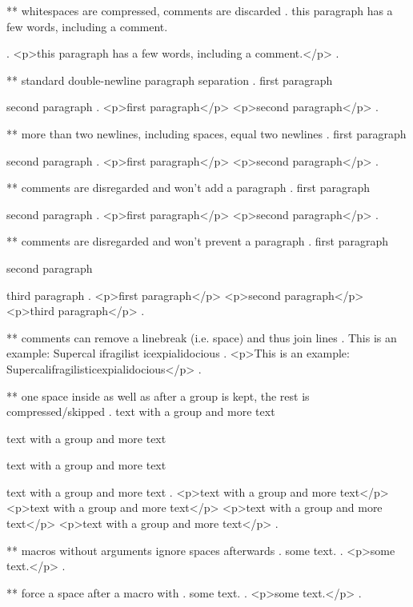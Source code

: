 ** whitespaces are compressed, comments are discarded
.
   this     paragraph  has a    few 
 words,   including
 a comment.


 
.
<p>this paragraph has a few words, including a comment.</p>
.



** standard double-newline paragraph separation
.
first paragraph

 second paragraph
.
<p>ﬁrst paragraph</p>
<p>second paragraph</p>
.



** more than two newlines, including spaces, equal two newlines
.
first paragraph

   
  


second paragraph
.
<p>ﬁrst paragraph</p>
<p>second paragraph</p>
.


** comments are disregarded and won't add a paragraph
.
first paragraph




second paragraph
.
<p>ﬁrst paragraph</p>
<p>second paragraph</p>
.

** comments are disregarded and won't prevent a paragraph
.
first paragraph %

second paragraph%

third paragraph
.
<p>ﬁrst paragraph</p>
<p>second paragraph</p>
<p>third paragraph</p>
.


** comments can remove a linebreak (i.e. space) and thus join lines
.
This is an %
example: Supercal%
              ifragilist%
    icexpialidocious
.
<p>This is an example: Supercalifragilisticexpialidocious</p>
.



** one space inside as well as after a group is kept, the rest is compressed/skipped
.
text with {a group} and more text

text with { a group } and more text

text with { a group  } and more text

text with {  a group  }  and more text
.
<p>text with a group and more text</p>
<p>text with  a group  and more text</p>
<p>text with  a group  and more text</p>
<p>text with  a group  and more text</p>
.

** macros without arguments ignore spaces afterwards
.
some \echo  text.
.
<p>some text.</p>
.

** force a space after a macro with {}
.
some \echo{} text.
.
<p>some  text.</p>
.
